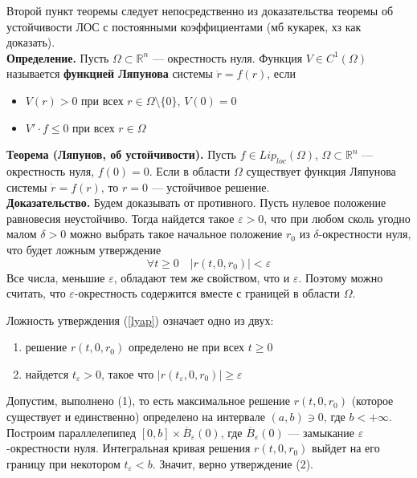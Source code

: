 Второй пункт теоремы следует непосредственно из доказательства теоремы об устойчивости ЛОС с постоянными коэффициентами (мб кукарек, хз как доказать).\\

\noindent \textbf{Определение.} Пусть $\Omega \subset \mathbb{R}^n$ --- окрестность нуля. Функция $V \in C^1(\Omega)$ называется \textbf{функцией Ляпунова} системы $\dot{r} = f(r)$, если
\begin{itemize}
    \item $V(r) > 0$ при всех $r \in \Omega \setminus \{0\}$, $V(0) = 0$
    \item $V' \cdot f \le 0$ при всех $r \in \Omega$
\end{itemize}

\noindent \textbf{Теорема (Ляпунов, об устойчивости).} Пусть $f \in Lip_{loc}(\Omega)$, $\Omega \subset \mathbb{R}^n$ --- окрестность нуля, $f(0) = 0$. Если в области $\Omega$ существует функция Ляпунова системы $\dot{r} = f(r)$, то $r = 0$ --- устойчивое решение.\\

\noindent \textbf{Доказательство.} Будем доказывать от противного. Пусть нулевое положение равновесия неустойчиво. Тогда найдется такое $\varepsilon > 0$, что при любом сколь угодно малом $\delta > 0$ можно выбрать такое начальное положение $r_0$ из $\delta$-окрестности нуля, что будет ложным утверждение
\begin{equation}
    \forall t \ge 0 \quad |r(t, 0, r_0)| < \varepsilon \label{lyap}
\end{equation}
Все числа, меньшие $\varepsilon$, обладают тем же свойством, что и $\varepsilon$. Поэтому можно считать, что $\varepsilon$-окрестность содержится вместе с границей в области $\Omega$.

Ложность утверждения (\ref{lyap}) означает одно из двух:
\begin{enumerate}
    \item решение $r(t, 0, r_0)$ определено не при всех $t \ge 0$
    \item найдется $t_{\varepsilon} > 0$, такое что $|r(t_{\varepsilon}, 0, r_0)| \ge \varepsilon$
\end{enumerate}

Допустим, выполнено (1), то есть максимальное решение $r(t, 0, r_0)$ (которое существует и единственно) определено на интервале $(a,b) \ni 0$, где $b < +\infty$. Построим параллелепипед $[0,b] \times \overline{B}_{\varepsilon}(0)$, где $\overline{B}_{\varepsilon}(0)$ --- замыкание $\varepsilon$-окрестности нуля. Интегральная кривая решения $r(t, 0, r_0)$ выйдет на его границу при некотором $t_{\varepsilon} < b$. Значит, верно утверждение (2).


